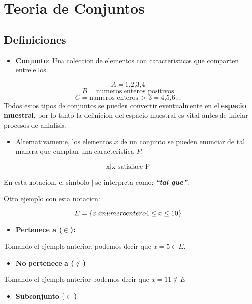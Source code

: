 \documentclass[]{book}
\providecommand{\tightlist}{%
  \setlength{\itemsep}{0pt}\setlength{\parskip}{0pt}}
\begin{document}
\section{Teoria de Conjuntos}\label{teoria-de-conjuntos-1}

\subsection{Definiciones}\label{definiciones-1}

\begin{itemize}
\tightlist
\item
  \textbf{Conjunto}: Una coleccion de elementos con caracteristicas que
  comparten entre ellos.
\end{itemize}

\[A=\text{{1,2,3,4}}\] \[B = \text{{numeros enteros positivos}}\]
\[ C = \text{{numeros enteros > 3}} = \text{{4,5,6...}}\] Todos estos
tipos de conjuntos se pueden convertir eventualmente en el
\textbf{espacio muestral}, por lo tanto la definicion del espacio
muestral es vital antes de iniciar procesos de anlalisis.

\begin{itemize}
\tightlist
\item
  Alternativamente, los elementos \(x\) de un conjunto se pueden
  enunciar de tal manera que cumplan una caracteristica \(P\).
\end{itemize}

\[\text{{x|x satisface P}}\]

En esta notacion, el simbolo \emph{\(|\)} se interpreta como:
\textbf{\emph{``tal que''}}.

Otro ejemplo con esta notacion:

\[ E = \{x|x \space numero\space entero\space 4 \leq x \leq 10\}\]

\begin{itemize}
\tightlist
\item
  \textbf{Pertenece a (\(\in\)):}
\end{itemize}

Tomando el ejemplo anterior, podemos decir que \(x = 5 \in E\).

\begin{itemize}
\tightlist
\item
  \textbf{No pertenece a (\(\notin\))}
\end{itemize}

Tomando el ejemplo anterior podemos decir que \(x = 11 \notin E\)

\begin{itemize}
\tightlist
\item
  \textbf{Subconjunto (\(\subset\))}
\end{itemize}
\end{document}
